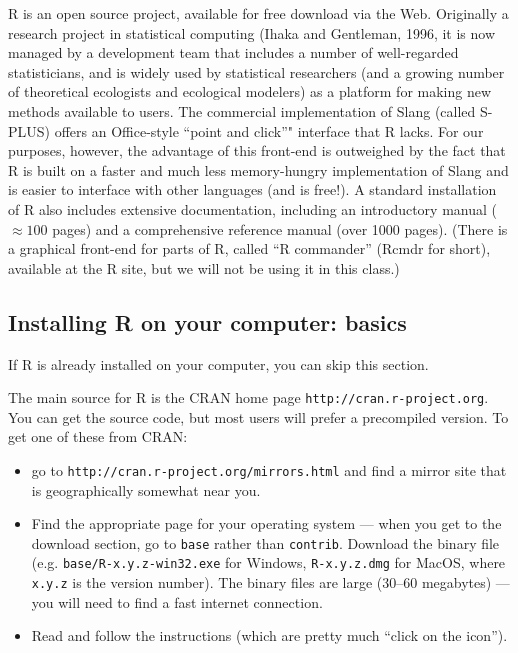 \documentclass[11pt,]{article}
\begin{document}
R is an open source project, available for free download via the Web.
Originally a research project in statistical computing (Ihaka and
Gentleman, 1996, it is now managed by a development team that includes a
number of well-regarded statisticians, and is widely used by statistical
researchers (and a growing number of theoretical ecologists and
ecological modelers) as a platform for making new methods available to
users. The commercial implementation of Slang (called S-PLUS) offers an
Office-style ``point and click''" interface that R lacks. For our
purposes, however, the advantage of this front-end is outweighed by the
fact that R is built on a faster and much less memory-hungry
implementation of Slang and is easier to interface with other languages
(and is free!). A standard installation of R also includes extensive
documentation, including an introductory manual (\(\approx 100\) pages)
and a comprehensive reference manual (over 1000 pages). (There is a
graphical front-end for parts of R, called ``R commander'' (Rcmdr for
short), available at the R site, but we will not be using it in this
class.)

\subsection{Installing R on your computer:
basics}\label{installing-r-on-your-computer-basics}

If R is already installed on your computer, you can skip this section.

The main source for R is the CRAN home page
\texttt{http://cran.r-project.org}. You can get the source code, but
most users will prefer a precompiled version. To get one of these from
CRAN:

\begin{itemize}
\item
  go to \texttt{http://cran.r-project.org/mirrors.html} and find a
  mirror site that is geographically somewhat near you.
\item
  Find the appropriate page for your operating system --- when you get
  to the download section, go to \texttt{base} rather than
  \texttt{contrib}. Download the binary file (e.g.
  \texttt{base/R-x.y.z-win32.exe} for Windows, \texttt{R-x.y.z.dmg} for
  MacOS, where \texttt{x.y.z} is the version number). The binary files
  are large (30--60 megabytes) --- you will need to find a fast internet
  connection.
\item
  Read and follow the instructions (which are pretty much ``click on the
  icon'').
\end{itemize}
\end{document}
